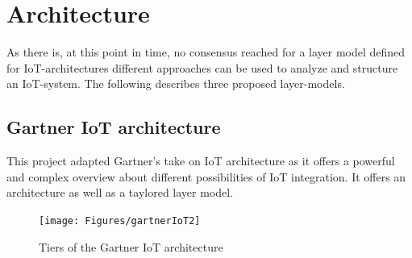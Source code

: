 \section{Architecture}

As there is, at this point in time, no consensus reached for a layer model defined for IoT-architectures \parencite{noModel}
different approaches can be used to analyze and structure an IoT-system. 
The following describes three proposed layer-models.

\subsection{Gartner IoT architecture}

This project adapted Gartner's take on IoT architecture as it offers a powerful and complex overview about different 
possibilities of IoT integration. 
It offers an architecture as well as a taylored layer model.

\begin{figure}[th]
	\centering
	\texttt{[image: Figures/gartnerIoT2]}
	\decoRule
	\caption[Gartner]{Tiers of the Gartner IoT architecture}
	\label{fig:gartnerIoT2}
\end{figure}

